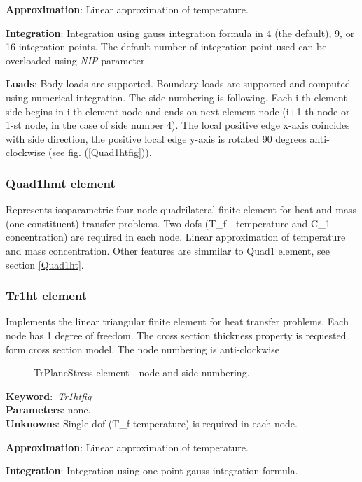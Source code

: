 \documentclass[12pt,dvips]{article}
\newcommand{\descitem}[1]{{\noindent \bf #1}:}
\newcommand{\elemkeyword}[1]{\descitem{Keyword}~{\em #1}}
\newcommand{\param}[1]{{\it #1}}
\begin{document}
\descitem{Approximation} Linear approximation of temperature.

\descitem{Integration}
Integration using gauss integration formula
in 4 (the default), 9, or 16 integration points. The default number of
integration point used can be overloaded using \param{NIP} parameter.

\descitem{Loads} Body loads are supported. Boundary loads are
supported and computed using numerical integration. The side numbering is
following. Each i-th element side begins in i-th element node and
ends on next element node (i+1-th node or 1-st node, in the case of 
side number 4). The local positive edge x-axis coincides with side
direction, the positive local edge y-axis is rotated 90 degrees
anti-clockwise (see fig. (\ref{Quad1htfig})).

\subsubsection{Quad1hmt element}
Represents isoparametric four-node quadrilateral finite element for
heat and mass (one constituent) transfer problems. 
Two dofs (T\_f - temperature and C\_1 - concentration) are required in
each node. Linear approximation of temperature and mass concentration.
Other features are simmilar to Quad1 element, see section \ref{Quad1ht}.

\subsubsection{Tr1ht element}
\label{Tr1ht}
Implements the linear triangular finite element for heat transfer problems. Each node has 1 degree of freedom.
The cross section thickness property is requested form cross section model.
The node numbering is anti-clockwise

\begin{figure}[htb]
\begin{center}\end{center}
\caption{TrPlaneStress element - node and side numbering.}
\label{Tr1htfig}
\end{figure}

\elemkeyword{Tr1htfig}\\
\descitem{Parameters} none.\\
\descitem{Unknowns}
Single dof (T\_f temperature) is  required in each node.

\descitem{Approximation} Linear approximation of temperature.

\descitem{Integration}
Integration using one point gauss integration formula.
\end{document}
